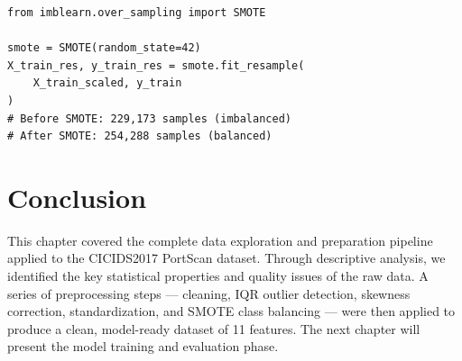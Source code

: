 \begin{lstlisting}[caption={Application of SMOTE on the training set}]
from imblearn.over_sampling import SMOTE

smote = SMOTE(random_state=42)
X_train_res, y_train_res = smote.fit_resample(
    X_train_scaled, y_train
)
# Before SMOTE: 229,173 samples (imbalanced)
# After SMOTE: 254,288 samples (balanced)
\end{lstlisting}

\section{Conclusion}

This chapter covered the complete data exploration and preparation pipeline applied to the CICIDS2017 PortScan dataset. Through descriptive analysis, we identified the key statistical properties and quality issues of the raw data. A series of preprocessing steps --- cleaning, IQR outlier detection, skewness correction, standardization, and SMOTE class balancing --- were then applied to produce a clean, model-ready dataset of 11 features. The next chapter will present the model training and evaluation phase.

